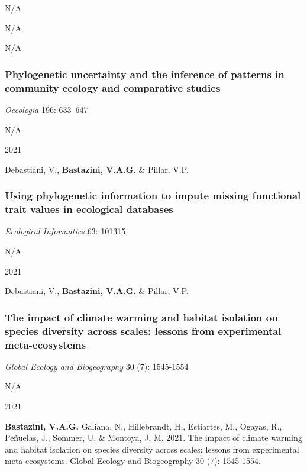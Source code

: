 \documentclass[
]{article}
\begin{document}
N/A

N/A

N/A

\hypertarget{phylogenetic-uncertainty-and-the-inference-of-patterns-in-community-ecology-and-comparative-studies}{%
\subsubsection{Phylogenetic uncertainty and the inference of patterns in
community ecology and comparative
studies}\label{phylogenetic-uncertainty-and-the-inference-of-patterns-in-community-ecology-and-comparative-studies}}

\emph{Oecologia} 196: 633--647

N/A

2021

Debastiani, V., \textbf{Bastazini, V.A.G.} \& Pillar, V.P.

\hypertarget{using-phylogenetic-information-to-impute-missing-functional-trait-values-in-ecological-databases}{%
\subsubsection{Using phylogenetic information to impute missing
functional trait values in ecological
databases}\label{using-phylogenetic-information-to-impute-missing-functional-trait-values-in-ecological-databases}}

\emph{Ecological Informatics} 63: 101315

N/A

2021

Debastiani, V., \textbf{Bastazini, V.A.G.} \& Pillar, V.P.

\hypertarget{the-impact-of-climate-warming-and-habitat-isolation-on-species-diversity-across-scales-lessons-from-experimental-meta-ecosystems}{%
\subsubsection{The impact of climate warming and habitat isolation on
species diversity across scales: lessons from experimental
meta-ecosystems}\label{the-impact-of-climate-warming-and-habitat-isolation-on-species-diversity-across-scales-lessons-from-experimental-meta-ecosystems}}

\emph{Global Ecology and Biogeography} 30 (7): 1545-1554

N/A

2021

\textbf{Bastazini, V.A.G.} Galiana, N., Hillebrandt, H., Estiartes, M.,
Ogayas, R., Peñuelas, J., Sommer, U. \& Montoya, J. M. 2021. The impact
of climate warming and habitat isolation on species diversity across
scales: lessons from experimental meta-ecosystems. Global Ecology and
Biogeography 30 (7): 1545-1554.
\end{document}
